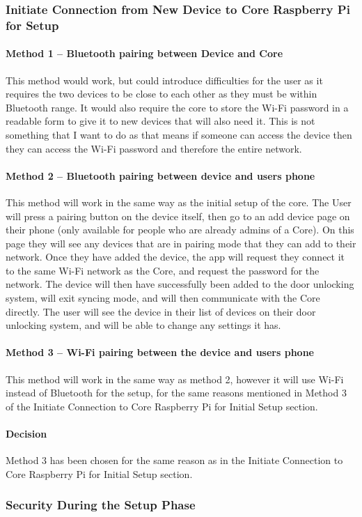 \subsubsection*{Initiate Connection from New Device to Core Raspberry Pi for Setup}

\paragraph*{Method 1 – Bluetooth pairing between Device and Core}
This method would work, but could introduce difficulties for the user as it requires the two devices to be close to each other as they must be within Bluetooth range. It would also require the core to store the Wi-Fi password in a readable form to give it to new devices that will also need it. This is not something that I want to do as that means if someone can access the device then they can access the Wi-Fi password and therefore the entire network.

\paragraph*{Method 2 – Bluetooth pairing between device and users phone}
This method will work in the same way as the initial setup of the core. The User will press a pairing button on the device itself, then go to an add device page on their phone (only available for people who are already admins of a Core). On this page they will see any devices that are in pairing mode that they can add to their network. Once they have added the device, the app will request they connect it to the same Wi-Fi network as the Core, and request the password for the network. The device will then have successfully been added to the door unlocking system, will exit syncing mode, and will then communicate with the Core directly. The user will see the device in their list of devices on their door unlocking system, and will be able to change any settings it has.

\paragraph*{Method 3 – Wi-Fi pairing between the device and users phone}
This method will work in the same way as method 2, however it will use Wi-Fi instead of Bluetooth for the setup, for the same reasons mentioned in Method 3 of the Initiate Connection to Core Raspberry Pi for Initial Setup section.

\paragraph*{Decision}
Method 3 has been chosen for the same reason as in the Initiate Connection to Core Raspberry Pi for Initial Setup section.

\subsubsection*{Security During the Setup Phase}
